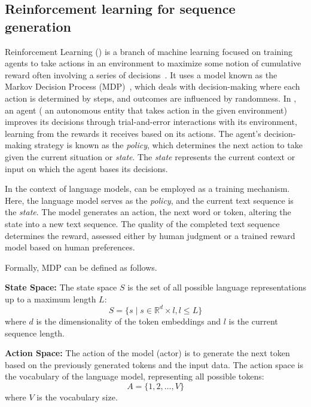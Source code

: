 \subsection{Reinforcement learning for sequence generation}

Reinforcement Learning (\rl{}) is a branch of machine learning focused on 
training agents to take actions in an environment to maximize some notion of cumulative reward often involving a series of decisions~\cite{shakya2023reinforcement}. 
It uses a model known as the Markov Decision Process (MDP)~\cite{puterman2014markov}, which deals with decision-making where each action is determined by steps, and outcomes are influenced by randomness. 
In \rl{}, an agent (\ie{} an autonomous entity that takes action in the given environment)
improves its decisions through trial-and-error interactions with its environment, learning from the rewards it receives based on its actions. The agent's decision-making strategy is known as the \textit{policy}, which determines the next action to take given the current situation or \textit{state}. The \textit{state} represents the current context or input on which the agent bases its decisions.


In the context of language models, \rl{} can be employed as a training mechanism. 
Here, the language model serves as the \textit{policy}, and the current text sequence is the \textit{state}. 
The model generates an action,
the next word or token,
altering the state into a new text sequence. 
The quality of the completed text sequence determines the reward, assessed either by human judgment or a trained reward model based on human preferences.

Formally, MDP can be defined as follows.

\textbf{State Space: }
The state space \(S\) is the set of all possible language representations up to a maximum length \(L\):
\begin{equation}
    S = \{s \mid s \in \mathbb{R}^d \times l, l \leq L\}
\end{equation}
where \(d\) is the dimensionality of the token embeddings and \(l\) is the current sequence length.

\textbf{Action Space: }
The action of the model (actor) is to generate the next token based on the previously generated tokens and the input data. The action space is the vocabulary of the language model, representing all possible tokens:
\begin{equation}
    A = \{1, 2, \ldots, V\}
\end{equation}
where \(V\) is the vocabulary size.

